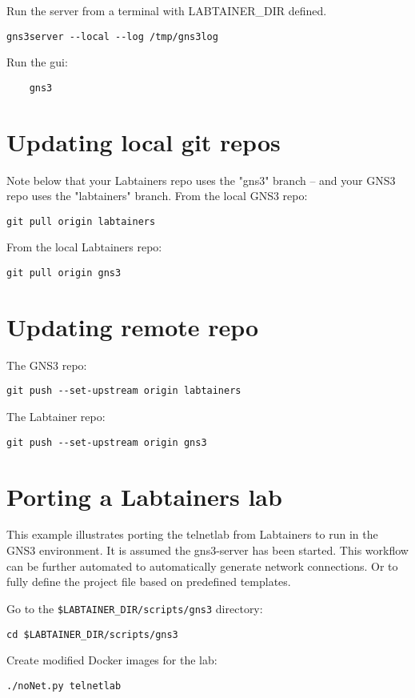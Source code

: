 \documentclass[12pt]{article}
\begin{document}
Run the server from a terminal with LABTAINER\_DIR defined.

\begin{verbatim}
gns3server --local --log /tmp/gns3log
\end{verbatim}

Run the gui:
\begin{verbatim}
    gns3
\end{verbatim}

\section{Updating local git repos}
Note below that your Labtainers repo uses the "gns3" branch -- and your GNS3 repo uses the "labtainers" branch.
From the local GNS3  repo:
\begin{verbatim}
git pull origin labtainers
\end{verbatim}

From the local Labtainers repo:
\begin{verbatim}
git pull origin gns3
\end{verbatim}

\section{Updating remote repo}
The GNS3 repo:
\begin{verbatim}
git push --set-upstream origin labtainers
\end{verbatim}

\noindent The Labtainer repo:
\begin{verbatim}
git push --set-upstream origin gns3
\end{verbatim}


\section{Porting a Labtainers lab}
This example illustrates porting the telnetlab from Labtainers to run in the GNS3 environment.
It is assumed the gns3-server has been started.
This workflow can be further automated to automatically generate network connections.  Or to fully define the project
file based on predefined templates.

Go to the {\tt \$LABTAINER\_DIR/scripts/gns3} directory:
\begin{verbatim}
cd $LABTAINER_DIR/scripts/gns3
\end{verbatim}

Create modified Docker images for the lab:
\begin{verbatim}
./noNet.py telnetlab
\end{verbatim}
\end{document}
